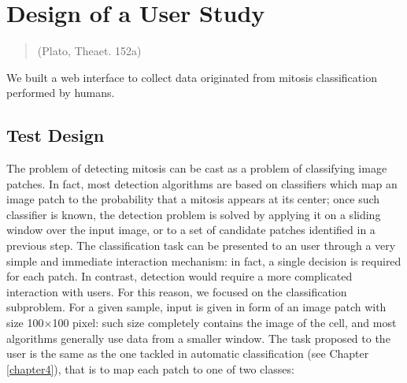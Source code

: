 \chapter{Design of a User Study}
\label{chapter5}
\thispagestyle{empty}

\begin{quotation}
{\footnotesize
{}
\begin{flushright}
 (Plato, Theaet. 152a)
\end{flushright}
}
\end{quotation}

\vspace{2cm}


\noindent We built a web interface to collect data originated from mitosis classification performed by humans.


\vspace{0.5cm}


\section{Test Design}

The problem of detecting mitosis can be cast as a problem of classifying image
patches. In fact, most detection algorithms are based on classifiers which map
an image patch to the probability that a mitosis appears at its center; once such
classifier is known, the detection problem is solved by applying it on a sliding
window over the input image, or to a set of candidate patches identified in a
previous step.
The classification task can be presented to an user through a very simple and immediate interaction mechanism: in fact, a single decision is required for each
patch. In contrast, detection would require a more complicated interaction with
users. For this reason, we focused on the classification subproblem.
For a given sample, input is given in form of an image patch with size 100$\times$100 pixel: such size completely contains the image of the cell, and most algorithms
generally use data from a smaller window. The task proposed to the user is the same as the one tackled in automatic classification (see Chapter \ref{chapter4}), that is to map each patch to one of two classes:

